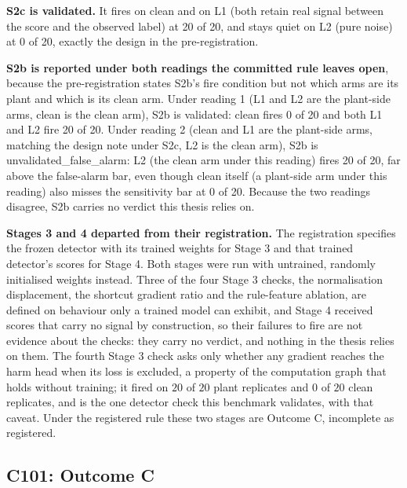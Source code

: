 \textbf{S2c is validated.} It fires on clean and on L1 (both retain real
signal between the score and the observed label) at 20 of 20, and stays
quiet on L2 (pure noise) at 0 of 20, exactly the design in the
pre-registration.

\textbf{S2b is reported under both readings the committed rule leaves open},
because the pre-registration states S2b's fire condition but not which arms
are its plant and which is its clean arm. Under reading 1 (L1 and L2 are the
plant-side arms, clean is the clean arm), S2b is validated: clean fires 0 of
20 and both L1 and L2 fire 20 of 20. Under reading 2 (clean and L1 are the
plant-side arms, matching the design note under S2c, L2 is the clean arm),
S2b is unvalidated\_false\_alarm: L2 (the clean arm under this reading) fires
20 of 20, far above the false-alarm bar, even though clean itself (a
plant-side arm under this reading) also misses the sensitivity bar at 0 of
20. Because the two readings disagree, S2b carries no verdict this thesis
relies on.

\textbf{Stages 3 and 4 departed from their registration.} The registration specifies
the frozen detector with its trained weights for Stage 3 and that trained
detector's scores for Stage 4. Both stages were run with untrained, randomly
initialised weights instead. Three of the four Stage 3 checks, the normalisation
displacement, the shortcut gradient ratio and the rule-feature ablation, are
defined on behaviour only a trained model can exhibit, and Stage 4 received
scores that carry no signal by construction, so their failures to fire are not
evidence about the checks: they carry no verdict, and nothing in the thesis
relies on them. The fourth Stage 3 check asks only whether any gradient reaches
the harm head when its loss is excluded, a property of the computation graph
that holds without training; it fired on $20$ of $20$ plant replicates and
$0$ of $20$ clean replicates, and is the one detector check this benchmark
validates, with that caveat. Under the
registered rule these two stages are Outcome C, incomplete as registered.

\subsection{C101: Outcome C}
\label{sup:sec:s5-c101}

